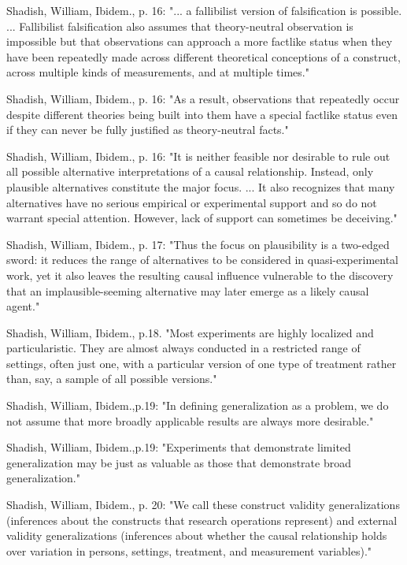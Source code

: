 Shadish, William, Ibidem., p. 16: "... a fallibilist version of falsification is possible. ... Fallibilist falsification also assumes that theory-neutral observation is impossible but that observations can approach a more factlike status when they have been repeatedly made across different theoretical conceptions of a construct, across multiple kinds of measurements, and at multiple times."

Shadish, William, Ibidem., p. 16: "As a result, observations that repeatedly occur despite different theories being built into them have a special factlike status even if they can never be fully justified as theory-neutral facts."

Shadish, William, Ibidem., p. 16: "It is neither feasible nor desirable to rule out all possible alternative interpretations of a causal relationship. Instead, only plausible alternatives constitute the major focus. ... It also recognizes that many alternatives have no serious empirical or experimental support and so do not warrant special attention. However, lack of support can sometimes be deceiving."

Shadish, William, Ibidem., p. 17: "Thus the focus on plausibility is a two-edged sword: it reduces the range of alternatives to be considered in quasi-experimental work, yet it also leaves the resulting causal influence vulnerable to the discovery that an implausible-seeming alternative may later emerge as a likely causal agent."

Shadish, William, Ibidem., p.18. "Most experiments are highly localized and particularistic. They are almost always conducted in a restricted range of settings, often just one, with a particular version of one type of treatment rather than, say, a sample of all possible versions."

Shadish, William, Ibidem.,p.19: "In defining generalization as a problem, we do not assume that more broadly applicable results are always more desirable."

Shadish, William, Ibidem.,p.19: "Experiments that demonstrate limited generalization may be just as valuable as those that demonstrate broad generalization."

Shadish, William, Ibidem., p. 20: "We call these construct validity generalizations (inferences about the constructs that research operations represent) and external validity generalizations (inferences about whether the causal relationship holds over variation in persons, settings, treatment, and measurement variables)."

